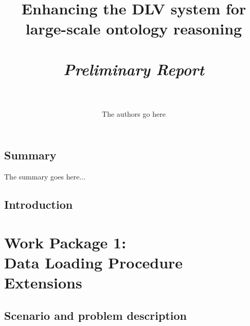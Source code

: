 \documentclass[oneside]{book}
\begin{document}
\title{\bf Enhancing the DLV system for\\large-scale ontology reasoning \\ \ \\
\Large \em Preliminary Report
\\ \ \\ }
\author{The authors go here}

\maketitle


\chapter*{Summary}
The summary goes here...


\tableofcontents
\listoffigures
\listoftables


\chapter*{Introduction}





\part*{Work Package 1:\\Data Loading Procedure Extensions}

\chapter{Scenario and problem description}
\end{document}
